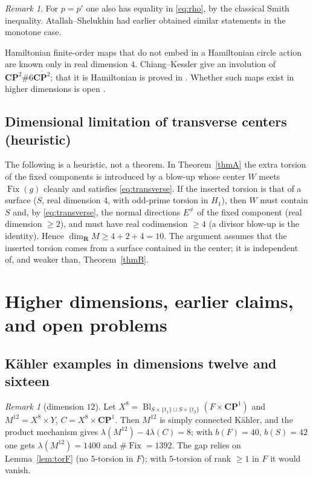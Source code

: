 \documentclass[11pt]{amsart}
\numberwithin{equation}{section}
\theoremstyle{definition}
\theoremstyle{remark}
\newtheorem{remark}[theorem]{Remark}
\newcommand{\CP}{\mathbf{CP}}
\newcommand{\R}{\mathbf R}
\DeclareMathOperator{\Fix}{Fix}
\DeclareMathOperator{\Bl}{Bl}
\begin{document}
\begin{remark}
For $p=p'$ one also has equality in \eqref{eq:rho}, by the classical Smith
inequality. Atallah--Shelukhin \cite[Thm.~G]{AtallahShelukhin2020} had
earlier obtained similar statements in the monotone case.

Hamiltonian finite-order maps that do not embed in a Hamiltonian circle
action are known only in real dimension $4$. Chiang--Kessler
\cite[\S5]{ChiangKessler2019} give an involution of
$\CP^2\#6\overline{\CP^2}$; that it is Hamiltonian is proved in
\cite[Cor.~1.8]{LiLiWu2022}. Whether such maps exist in higher dimensions
is open \cite[Question~1.10]{LiLiWu2022}.
\end{remark}

\subsection{Dimensional limitation of transverse centers (heuristic)}\label{subsec:dimlimit}

The following is a heuristic, not a theorem. In Theorem~\ref{thmA} the extra torsion of the fixed components is
introduced by a blow-up whose center $W$ meets $\Fix(g)$ cleanly and
satisfies \eqref{eq:transverse}. If the inserted torsion is that of a
surface ($S$, real dimension $4$, with odd-prime torsion in $H_1$), then
$W$ must contain $S$ and, by \eqref{eq:transverse}, the normal directions
$E^{\ne}$ of the fixed component (real dimension $\ge2$), and must have
real codimension $\ge4$ (a divisor blow-up is the identity). Hence
$\dim_\R M\ge4+2+4=10$. The argument assumes that the inserted torsion
comes from a surface contained in the center; it is independent of, and
weaker than, Theorem~\ref{thmB}.

\section{Higher dimensions, earlier claims, and open problems}\label{sec:higher}

\subsection{K\"ahler examples in dimensions twelve and sixteen}\label{subsec:higher}

\begin{remark}[dimension $12$]\label{rem:dim12}
Let $X^8=\Bl_{S\times\{t_1\}\sqcup S\times\{t_2\}}(F\times\CP^1)$ and
$M^{12}=X^8\times Y$, $C=X^8\times\CP^1$. Then $M^{12}$ is simply connected
K\"ahler, and the product mechanism gives
$\lambda(M^{12})-4\lambda(C)=8$; with $b(F)=40$, $b(S)=42$ one gets
$\lambda(M^{12})=1400$ and $\#\Fix=1392$. The gap relies on
Lemma~\ref{lem:torF} (no $5$-torsion in $F$); with $5$-torsion of
rank $\ge1$ in $F$ it would vanish.
\end{remark}
\end{document}
